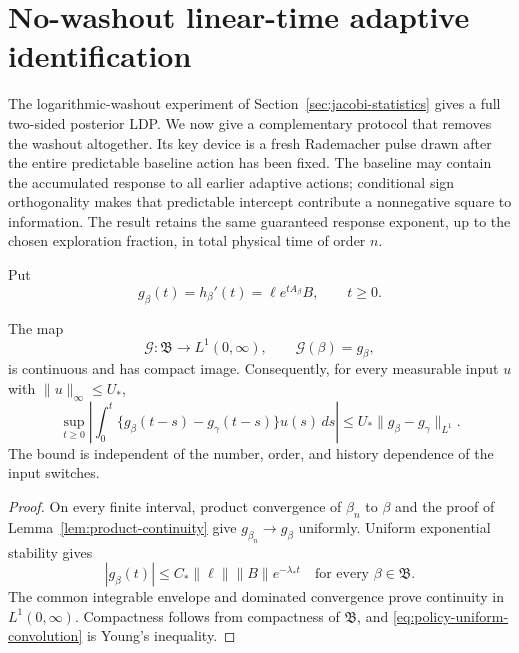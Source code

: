 
\section{No-washout linear-time adaptive identification}
\label{sec:linear-time-protocol}

The logarithmic-washout experiment of
Section~\ref{sec:jacobi-statistics} gives a full two-sided posterior LDP.  We
now give a complementary protocol that removes the washout altogether.  Its
key device is a fresh Rademacher pulse drawn after the entire predictable
baseline action has been fixed.  The baseline may contain the accumulated
response to all earlier adaptive actions; conditional sign orthogonality makes
that predictable intercept contribute a nonnegative square to information.
The result retains the same guaranteed response exponent, up to the chosen
exploration fraction, in total physical time of order \(n\).

Put
\[
 g_\beta(t)=h_\beta'(t)=\ell e^{tA_\beta}B,
 \qquad t\ge0.
\]

\begin{lemma}
\label{lem:l1-impulse-geometry}
The map
\begin{equation}
 \mathcal G:\mathfrak B\longrightarrow L^1(0,\infty),
 \qquad \mathcal G(\beta)=g_\beta,
 \label{eq:l1-impulse-map}
\end{equation}
is continuous and has compact image.  Consequently, for every measurable
input \(u\) with \(\|u\|_\infty\le U_*\),
\begin{equation}
 \sup_{t\ge0}\left|
 \int_0^t\{g_\beta(t-s)-g_\gamma(t-s)\}u(s)\,ds
 \right|
 \le U_*\|g_\beta-g_\gamma\|_{L^1}.
 \label{eq:policy-uniform-convolution}
\end{equation}
The bound is independent of the number, order, and history dependence of the
input switches.
\end{lemma}

\begin{proof}
On every finite interval, product convergence of \(\beta_n\) to \(\beta\)
and the proof of Lemma~\ref{lem:product-continuity} give
\(g_{\beta_n}\to g_\beta\) uniformly.  Uniform exponential stability gives
\[
 |g_\beta(t)|\le C_*\|\ell\|\|B\|e^{-\lambda_*t}
 \quad\text{for every }\beta\in\mathfrak B.
\]
The common integrable envelope and dominated convergence prove continuity in
\(L^1(0,\infty)\).  Compactness follows from compactness of \(\mathfrak B\),
and \eqref{eq:policy-uniform-convolution} is Young's inequality.
\end{proof}

